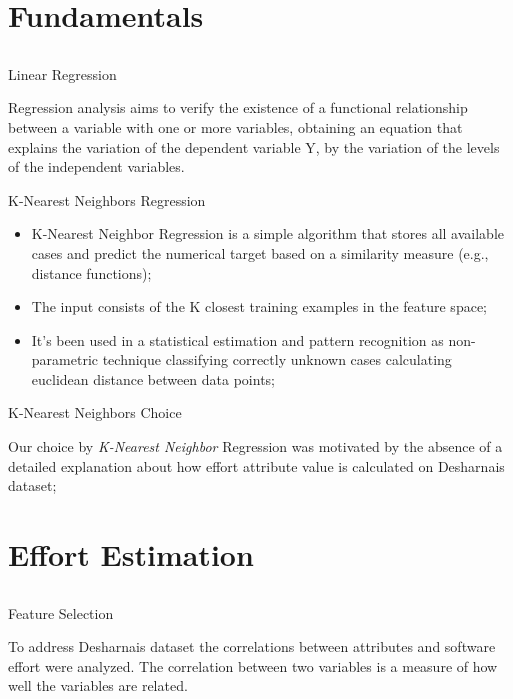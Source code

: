 \documentclass{beamer}
\begin{document}
\section{Fundamentals}
\subsection{}
\begin{frame}{Linear Regression}
	\begin{block}{}
		Regression analysis aims to verify the existence of a functional relationship between a variable with one or more variables, obtaining an equation that explains the variation of the dependent variable Y, by the variation of the levels of the independent
variables.
	\end{block}
\end{frame}

\begin{frame}{K-Nearest Neighbors Regression}
	\begin{block}{}
		\begin{itemize}[<+->]
			\item K-Nearest Neighbor Regression is a simple algorithm that stores all available cases and predict the numerical target based on a similarity measure (e.g., distance functions);
            \item  The input consists of the K closest training examples in the feature space;
            \item It’s been used in a statistical estimation and pattern recognition as non-parametric technique classifying correctly unknown cases calculating euclidean distance between data points;
		\end{itemize}
	\end{block}
\end{frame}

\begin{frame}{K-Nearest Neighbors Choice}
	\begin{block}{}
			Our choice by \textit{K-Nearest Neighbor} Regression was motivated by the absence of a detailed explanation about how effort attribute value is calculated on Desharnais dataset;
	\end{block}
\end{frame}

\section{Effort Estimation}
\subsection{}
\begin{frame}{Feature Selection}
	\begin{block}{}
	To address Desharnais dataset the correlations between attributes and software effort were analyzed. The correlation between two variables is a measure of how well the variables are related.
	\end{block}
\end{frame}
\end{document}
